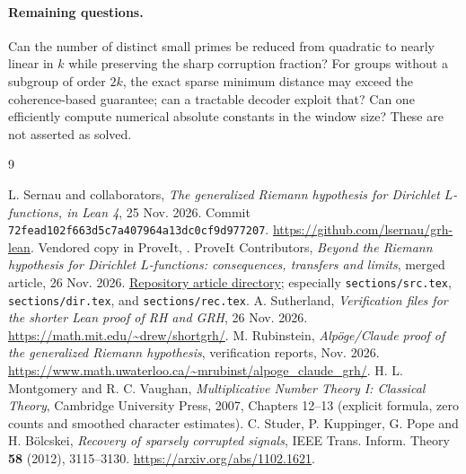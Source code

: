 \documentclass[11pt]{article}
\theoremstyle{remark}\newtheorem{remark}[theorem]{Remark}
\newcommand{\code}[1]{\texttt{#1}}
\begin{document}
\paragraph{Remaining questions.} Can the number of distinct small primes be reduced from quadratic to nearly linear in $k$ while preserving the sharp corruption fraction? For groups without a subgroup of order $2k$, the exact sparse minimum distance may exceed the coherence-based guarantee; can a tractable decoder exploit that? Can one efficiently compute numerical absolute constants in the window size? These are not asserted as solved.

\begin{thebibliography}{9}
\raggedright
{} L. Sernau and collaborators, \emph{The generalized Riemann hypothesis for Dirichlet $L$-functions, in Lean 4}, 25 Nov. 2026. Commit \code{72fead102f663d5c7a407964a13dc0cf9d977207}. \url{https://github.com/lsernau/grh-lean}. Vendored copy in ProveIt, .
 ProveIt Contributors, \emph{Beyond the Riemann hypothesis for Dirichlet $L$-functions: consequences, transfers and limits}, merged article, 26 Nov. 2026. \href{https://github.com/VladimirReshetnikov/ProveIt/tree/main/Analysis/GeneralizedRiemannHypothesis/Article}{Repository article directory}; especially \code{sections/src.tex}, \code{sections/dir.tex}, and \code{sections/rec.tex}.
 A. Sutherland, \emph{Verification files for the shorter Lean proof of RH and GRH}, 26 Nov. 2026. \url{https://math.mit.edu/~drew/shortgrh/}.
 M. Rubinstein, \emph{Alp\"oge/Claude proof of the generalized Riemann hypothesis}, verification reports, Nov. 2026. \url{https://www.math.uwaterloo.ca/~mrubinst/alpoge_claude_grh/}.
 H. L. Montgomery and R. C. Vaughan, \emph{Multiplicative Number Theory I: Classical Theory}, Cambridge University Press, 2007, Chapters 12--13 (explicit formula, zero counts and smoothed character estimates).
 C. Studer, P. Kuppinger, G. Pope and H. B\"olcskei, \emph{Recovery of sparsely corrupted signals}, IEEE Trans. Inform. Theory \textbf{58} (2012), 3115--3130. \url{https://arxiv.org/abs/1102.1621}.
\end{thebibliography}
\end{document}
